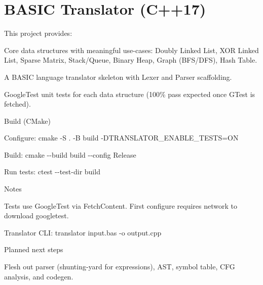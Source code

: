 \chapter{BASIC Translator (C++17) }
\hypertarget{index}{}\label{index}
\label{index_md__c_1_2_users_2ahmet_2_one_drive_2_masaütü_data_structure_2cen207-2025-2026-5-_mustafa-_yildirimm-cpp_2_r_e_a_d_m_e}%
%


This project provides\+:
\begin{DoxyItemize}
\item Core data structures with meaningful use-\/cases\+: Doubly Linked List, XOR Linked List, Sparse Matrix, Stack/\+Queue, Binary Heap, Graph (BFS/\+DFS), Hash Table.
\item A BASIC language translator skeleton with Lexer and Parser scaffolding.
\item Google\+Test unit tests for each data structure (100\% pass expected once GTest is fetched).
\end{DoxyItemize}

Build (CMake)
\begin{DoxyItemize}
\item Configure\+: {\ttfamily cmake -\/S . -\/B build -\/DTRANSLATOR\+\_\+\+ENABLE\+\_\+\+TESTS=ON}
\item Build\+: {\ttfamily cmake -\/-\/build build -\/-\/config Release}
\item Run tests\+: {\ttfamily ctest -\/-\/test-\/dir build}
\end{DoxyItemize}

Notes
\begin{DoxyItemize}
\item Tests use Google\+Test via Fetch\+Content. First configure requires network to download googletest.
\item Translator CLI\+: {\ttfamily translator input.\+bas -\/o output.\+cpp}
\end{DoxyItemize}

Planned next steps
\begin{DoxyItemize}
\item Flesh out parser (shunting-\/yard for expressions), AST, symbol table, CFG analysis, and codegen. 
\end{DoxyItemize}